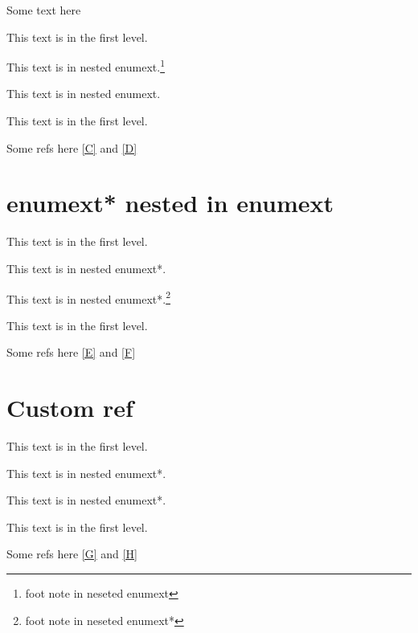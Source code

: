 \documentclass{article}
\begin{document}
Some text here

\begin{enumext*}
  \item This text is in the first level.\label{C}
  \item \begin{enumext}
              \item This text is in nested enumext.\label{D}\footnote{foot note in neseted enumext}
              \item This text is in nested enumext.\footnotemark[40]
         \end{enumext}
  \item This text is in the first level.
\end{enumext*}

Some refs here \ref{C} and \ref{D} 

\section{enumext* nested in enumext}

\begin{enumext}
  \item This text is in the first level. \label{E}
  \item \begin{enumext*}[label=\roman*.]
              \item This text is in nested enumext*.\label{F}\footnotemark[50]
              \item This text is in nested enumext*.\footnote{foot note in neseted enumext*}
         \end{enumext*}
  \item This text is in the first level.
\end{enumext}

Some refs here \ref{E} and \ref{F} 

\section{Custom ref}

\begin{enumext}[ref={enumext-level-\arabic*}]
  \item This text is in the first level. \label{G}
  \item \begin{enumext*}[label=\roman*., ref={nested-\arabic{enumXi}.\roman*}]
              \item This text is in nested enumext*.\label{H}
              \item This text is in nested enumext*.
         \end{enumext*}
  \item This text is in the first level.
\end{enumext}

Some refs here \ref{G} and \ref{H}
\end{document}
